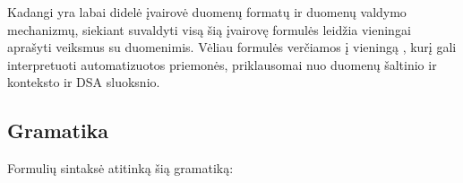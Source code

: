 \documentclass[letterpaper,10pt,lithuanian]{sphinxmanual}
\begin{document}
\sphinxAtStartPar
Kadangi yra labai didelė įvairovė duomenų formatų ir duomenų valdymo mechanizmų,
siekiant suvaldyti visą šią įvairovę {\hyperref[\detokenize{savokos:term-DSA}]{}} formulės leidžia vieningai
aprašyti veiksmus su duomenimis. Vėliau formulės verčiamos į vieningą , kurį
gali interpretuoti automatizuotos priemonės, priklausomai nuo duomenų šaltinio
ir konteksto ir DSA sluoksnio.


\subsection{Gramatika}
\label{\detokenize{formules:gramatika}}
\sphinxAtStartPar
Formulių sintaksė atitinką šią  gramatiką:
\end{document}
